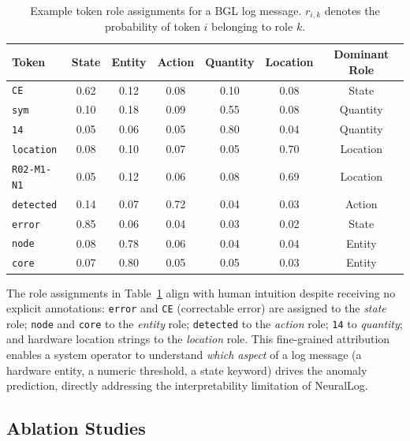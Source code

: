 \begin{table}[h]
\centering
\caption{Example token role assignments for a BGL log message. $r_{i,k}$ denotes the probability of token $i$ belonging to role $k$.}
\label{tab:role_example}
\renewcommand{\arraystretch}{1.25}
\begin{tabular}{lcccccc}
\toprule
\textbf{Token} & \textbf{State} & \textbf{Entity} & \textbf{Action} & \textbf{Quantity} & \textbf{Location} & \textbf{Dominant Role}\\
\midrule
\texttt{CE}         & 0.62 & 0.12 & 0.08 & 0.10 & 0.08 & State \\
\texttt{sym}        & 0.10 & 0.18 & 0.09 & 0.55 & 0.08 & Quantity \\
\texttt{14}         & 0.05 & 0.06 & 0.05 & 0.80 & 0.04 & Quantity \\
\texttt{location}   & 0.08 & 0.10 & 0.07 & 0.05 & 0.70 & Location \\
\texttt{R02-M1-N1}  & 0.05 & 0.12 & 0.06 & 0.08 & 0.69 & Location \\
\texttt{detected}   & 0.14 & 0.07 & 0.72 & 0.04 & 0.03 & Action \\
\texttt{error}      & 0.85 & 0.06 & 0.04 & 0.03 & 0.02 & State \\
\texttt{node}       & 0.08 & 0.78 & 0.06 & 0.04 & 0.04 & Entity \\
\texttt{core}       & 0.07 & 0.80 & 0.05 & 0.05 & 0.03 & Entity \\
\bottomrule
\end{tabular}
\end{table}

\noindent The role assignments in Table~\ref{tab:role_example} align with human intuition despite receiving no explicit annotations: \texttt{error} and \texttt{CE} (correctable error) are assigned to the \emph{state} role; \texttt{node} and \texttt{core} to the \emph{entity} role; \texttt{detected} to the \emph{action} role; \texttt{14} to \emph{quantity}; and hardware location strings to the \emph{location} role. This fine-grained attribution enables a system operator to understand \emph{which aspect} of a log message (a hardware entity, a numeric threshold, a state keyword) drives the anomaly prediction, directly addressing the interpretability limitation of NeuralLog.



\subsection{Ablation Studies}

